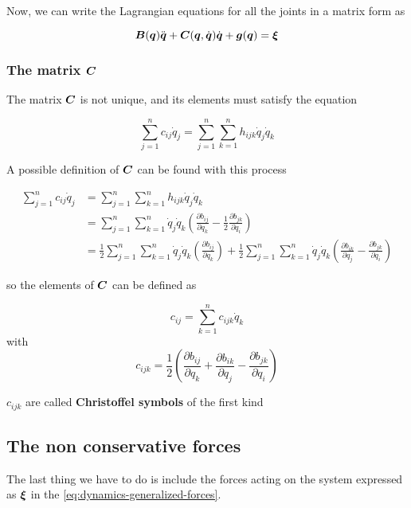 Now, we can write the Lagrangian equations for all the joints in a matrix form as

\begin{equation}
    \boldsymbol{B}(\boldsymbol{q})\ddot{\boldsymbol{q}} + \boldsymbol{C}(\boldsymbol{q},\dot{\boldsymbol{q}})\dot{\boldsymbol{q}} + \boldsymbol{g}(\boldsymbol{q}) = \boldsymbol{\xi} \label{eq:dynamics-generalized-forces}
\end{equation}

\subsubsection{The matrix $\boldsymbol{C}$}

The matrix $\boldsymbol{C}$ is not unique, and its elements must satisfy the equation

\[
	\sum_{j=1}^n c_{ij} \dot{q}_j = \sum_{j=1}^n \sum_{k=1}^n h_{ijk} \dot{q}_j \dot{q}_k
\]

A possible definition of $\boldsymbol{C}$ can be found with this process

\begin{align*}
    \sum_{j=1}^n c_{ij} \dot{q}_j &= \sum_{j=1}^n \sum_{k=1}^n h_{ijk} \dot{q}_j \dot{q}_k \\
    &= \sum_{j=1}^n \sum_{k=1}^n  \dot{q}_j \dot{q}_k \left( \frac{\partial b_{ij}}{\partial q_k} - \frac{1}{2} \frac{\partial b_{jk}}{\partial q_i} \right) \\
    &= \frac{1}{2} \sum_{j=1}^n \sum_{k=1}^n  \dot{q}_j \dot{q}_k \left( \frac{\partial b_{ij}}{\partial q_k} \right) +
    \frac{1}{2} \sum_{j=1}^n \sum_{k=1}^n  \dot{q}_j \dot{q}_k \left( \frac{\partial b_{ik}}{\partial q_j} - \frac{\partial b_{jk}}{\partial q_i} \right)
\end{align*}

so the elements of $\boldsymbol{C}$ can be defined as

\[
	c_{ij} = \sum_{k=1}^n c_{ijk}\dot{q}_k
\]
with
\[
	c_{ijk} = \frac{1}{2} \left( \frac{\partial b_{ij}}{\partial q_k} + \frac{\partial b_{ik}}{\partial q_j} - \frac{\partial b_{jk}}{\partial q_i} \right)
\]

$c_{ijk}$ are called \textbf{Christoffel symbols} of the first kind

\subsection{The non conservative forces}

The last thing we have to do is include the forces acting on the system expressed as $\boldsymbol{\xi}$ in the \autoref{eq:dynamics-generalized-forces}.

